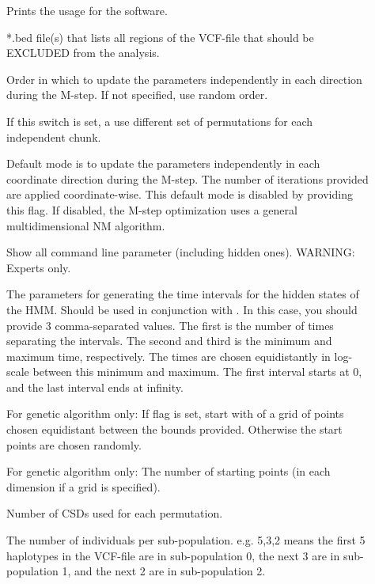 \documentclass{article}
\numberwithin{equation}{section}
\begin{document}
\begin{description}
	\item[] Prints the usage for the software.
	\item[] *.bed file(s) that lists all regions of the VCF-file that should be EXCLUDED from the analysis.
	\item[] Order in which to update the parameters independently in each direction during the M-step. If not specified, use random order.
	\item[] If this switch is set, a use different set of permutations for each independent chunk.
	\item[] Default mode is to update the parameters independently in each coordinate direction during the M-step. The number of iterations provided are applied coordinate-wise. This default mode is disabled by providing this flag. If disabled, the M-step optimization uses a general multidimensional NM algorithm.
	\item[] Show all command line parameter (including hidden ones). WARNING: Experts only.
	\item[] The parameters for generating the time intervals for the hidden states of the HMM. Should be used in conjunction with . In this case, you should provide 3 comma-separated values. The first is the number of times separating the intervals. The second and third is the minimum and maximum time, respectively. The times are chosen equidistantly in log-scale between this minimum and maximum. The first interval starts at 0, and the last interval ends at infinity.
 	\item[] For genetic algorithm only: If flag is set, start with of a grid of points chosen equidistant between the bounds provided. Otherwise the start points are chosen randomly.
	\item[] For genetic algorithm only: The number of starting points (in each dimension if a grid is specified).
	\item[] Number of CSDs used for each permutation.
	\item[] The number of individuals per sub-population. e.g. 5,3,2 means the first 5 haplotypes in the VCF-file are in sub-population 0, the next 3 are in sub-population 1, and the next 2 are in sub-population 2.

\end{description}
\end{document}
